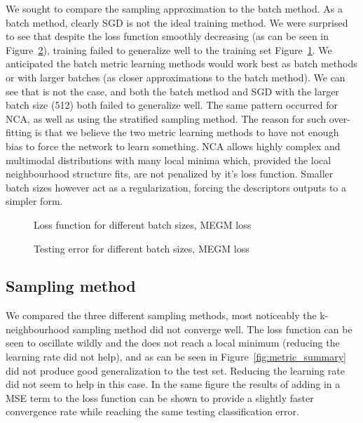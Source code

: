 We sought to compare the sampling approximation to the batch method.
As a batch method, clearly \gls{SGD} is not the ideal training method. We were
surprised to see that despite the loss function smoothly decreasing (as can be
seen in Figure~\ref{fig:metric_megm_test}), training failed to generalize well to the training set Figure~\ref{fig:metric_megm_loss}.
We anticipated the batch metric learning methods would work best as batch
methods or with larger batches (as closer approximations to the batch method).
We can see that is not the case, and both the batch method and \gls{SGD} with the
larger batch size (512) both failed to generalize well. The same pattern occurred
for \gls{NCA}, as well as using the stratified sampling method.
The reason for such over-fitting is that we believe the two metric learning
methods to have not enough bias to force the network to learn something. \gls{NCA}
allows highly complex and multimodal distributions with many local minima
which, provided the local neighbourhood structure fits, are not penalized by it’s
loss function. Smaller batch sizes however act as a regularization, forcing the
descriptors outputs to a simpler form.



\begin{figure}[ht]
   
   \caption{Loss function for different batch sizes, MEGM loss}
   \label {fig:metric_megm_loss}
\end{figure}

\begin{figure}[ht]
   
   \caption{Testing error for different batch sizes, MEGM loss}
   \label {fig:metric_megm_test}
\end{figure}



\subsection{Sampling method}

We compared the three different sampling methods, most noticeably the k-neighbourhood sampling method did not converge well. The loss function can be seen to oscillate wildly and the does not reach a local minimum (reducing the learning rate did not help), and as can be seen in Figure~\ref{fig:metric_summary} did not produce good generalization to the test set. Reducing the learning rate did not seem to help in this case. In the same figure the results of adding in a \gls{MSE} term to the loss function can be shown to provide a slightly faster convergence rate while reaching the same testing classification error.


